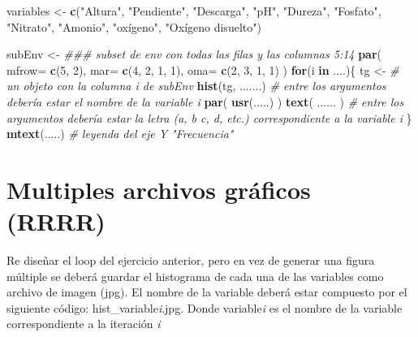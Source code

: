 \documentclass[]{book}
\newenvironment{Shaded}{\begin{snugshade}}{\end{snugshade}}
\newcommand{\CommentTok}[1]{\textcolor[rgb]{0.56,0.35,0.01}{\textit{#1}}}
\newcommand{\ControlFlowTok}[1]{\textcolor[rgb]{0.13,0.29,0.53}{\textbf{#1}}}
\newcommand{\DataTypeTok}[1]{\textcolor[rgb]{0.13,0.29,0.53}{#1}}
\newcommand{\DecValTok}[1]{\textcolor[rgb]{0.00,0.00,0.81}{#1}}
\newcommand{\KeywordTok}[1]{\textcolor[rgb]{0.13,0.29,0.53}{\textbf{#1}}}
\newcommand{\NormalTok}[1]{#1}
\newcommand{\StringTok}[1]{\textcolor[rgb]{0.31,0.60,0.02}{#1}}
\begin{document}
\begin{Shaded}
\begin{Highlighting}[]
\NormalTok{variables <-}\StringTok{ }\KeywordTok{c}\NormalTok{(}\StringTok{"Altura"}\NormalTok{, }\StringTok{"Pendiente"}\NormalTok{, }\StringTok{"Descarga"}\NormalTok{, }\StringTok{"pH"}\NormalTok{, }\StringTok{"Dureza"}\NormalTok{, }\StringTok{"Fosfato"}\NormalTok{, }\StringTok{"Nitrato"}\NormalTok{, }\StringTok{"Amonio"}\NormalTok{, }\StringTok{"oxígeno"}\NormalTok{, }\StringTok{"Oxígeno disuelto"}\NormalTok{)}

\NormalTok{subEnv <-}\StringTok{  }\CommentTok{### subset de env con todas las filas y las columnas 5:14}
\KeywordTok{par}\NormalTok{( }\DataTypeTok{mfrow=} \KeywordTok{c}\NormalTok{(}\DecValTok{5}\NormalTok{, }\DecValTok{2}\NormalTok{), }\DataTypeTok{mar=} \KeywordTok{c}\NormalTok{(}\DecValTok{4}\NormalTok{, }\DecValTok{2}\NormalTok{, }\DecValTok{1}\NormalTok{, }\DecValTok{1}\NormalTok{), }\DataTypeTok{oma=} \KeywordTok{c}\NormalTok{(}\DecValTok{2}\NormalTok{, }\DecValTok{3}\NormalTok{, }\DecValTok{1}\NormalTok{, }\DecValTok{1}\NormalTok{) )}
   \ControlFlowTok{for}\NormalTok{(i }\ControlFlowTok{in}\NormalTok{ ....)\{}
\NormalTok{     tg <-}\StringTok{ }\CommentTok{# un objeto con la columna i de subEnv}
\StringTok{     }\KeywordTok{hist}\NormalTok{(tg, .......) }\CommentTok{# entre los argumentos debería estar el nombre de la variable i}
     \KeywordTok{par}\NormalTok{( }\KeywordTok{usr}\NormalTok{(.....) )}
     \KeywordTok{text}\NormalTok{( ...... ) }\CommentTok{# entre los argumentos debería estar la letra (a, b c, d, etc.) correspondiente a la variable i}
\NormalTok{     \}}
  \KeywordTok{mtext}\NormalTok{(.....) }\CommentTok{# leyenda del eje Y "Frecuencia"}
\end{Highlighting}
\end{Shaded}

\hypertarget{multiples-archivos-gruxe1ficos-rrrr}{%
\section{Multiples archivos gráficos (RRRR)}\label{multiples-archivos-gruxe1ficos-rrrr}}

Re diseñar el loop del ejercicio anterior, pero en vez de generar una figura múltiple se deberá guardar el histograma de cada una de las variables como archivo de imagen (jpg). El nombre de la variable deberá estar compuesto por el siguiente código: hist\_variable\emph{i}.jpg. Donde variable\emph{i} es el nombre de la variable correspondiente a la iteración \emph{i}
\end{document}

